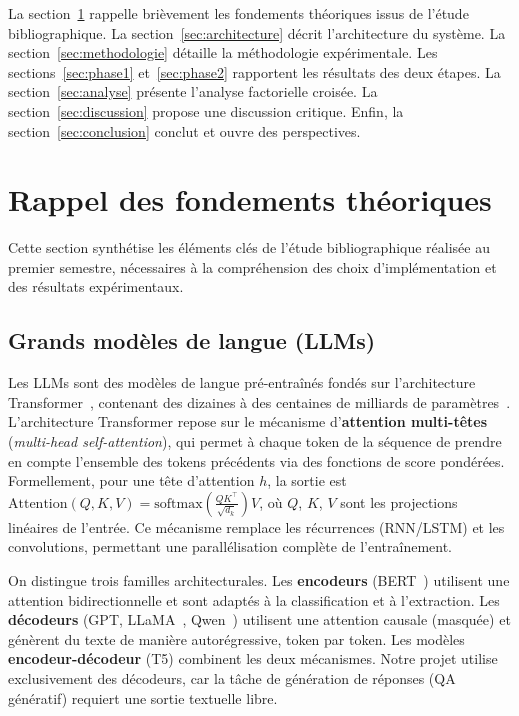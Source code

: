 \documentclass[12pt,a4paper]{article}
\begin{document}
La section~\ref{sec:rappel_biblio} rappelle bri\`evement les fondements th\'eoriques issus de l'\'etude bibliographique. La section~\ref{sec:architecture} d\'ecrit l'architecture du syst\`eme. La section~\ref{sec:methodologie} d\'etaille la m\'ethodologie exp\'erimentale. Les sections~\ref{sec:phase1} et~\ref{sec:phase2} rapportent les r\'esultats des deux \'etapes. La section~\ref{sec:analyse} pr\'esente l'analyse factorielle crois\'ee. La section~\ref{sec:discussion} propose une discussion critique. Enfin, la section~\ref{sec:conclusion} conclut et ouvre des perspectives.


\section{Rappel des fondements th\'eoriques}
\label{sec:rappel_biblio}

Cette section synth\'etise les \'el\'ements cl\'es de l'\'etude bibliographique r\'ealis\'ee au premier semestre, n\'ecessaires \`a la compr\'ehension des choix d'impl\'ementation et des r\'esultats exp\'erimentaux.

\subsection{Grands mod\`eles de langue (LLMs)}

Les LLMs sont des mod\`eles de langue pr\'e-entra\^in\'es fond\'es sur l'architecture Transformer~\cite{vaswani2017attention}, contenant des dizaines \`a des centaines de milliards de param\`etres~\cite{zhao_survey_2025}. L'architecture Transformer repose sur le m\'ecanisme d'\textbf{attention multi-t\^etes} (\textit{multi-head self-attention}), qui permet \`a chaque token de la s\'equence de prendre en compte l'ensemble des tokens pr\'ec\'edents via des fonctions de score pond\'er\'ees. Formellement, pour une t\^ete d'attention $h$, la sortie est $\text{Attention}(Q, K, V) = \text{softmax}\!\left(\frac{QK^\top}{\sqrt{d_k}}\right)V$, o\`u $Q$, $K$, $V$ sont les projections lin\'eaires de l'entr\'ee. Ce m\'ecanisme remplace les r\'ecurrences (RNN/LSTM) et les convolutions, permettant une parall\'elisation compl\`ete de l'entra\^inement.

On distingue trois familles architecturales. Les \textbf{encodeurs} (BERT~\cite{devlin2019bert}) utilisent une attention bidirectionnelle et sont adapt\'es \`a la classification et \`a l'extraction. Les \textbf{d\'ecodeurs} (GPT, LLaMA~\cite{touvron2023llama}, Qwen~\cite{yang2025qwen3}) utilisent une attention causale (masqu\'ee) et g\'en\`erent du texte de mani\`ere autor\'egressive, token par token. Les mod\`eles \textbf{encodeur-d\'ecodeur} (T5) combinent les deux m\'ecanismes. Notre projet utilise exclusivement des d\'ecodeurs, car la t\^ache de g\'en\'eration de r\'eponses (QA g\'en\'eratif) requiert une sortie textuelle libre.
\end{document}
